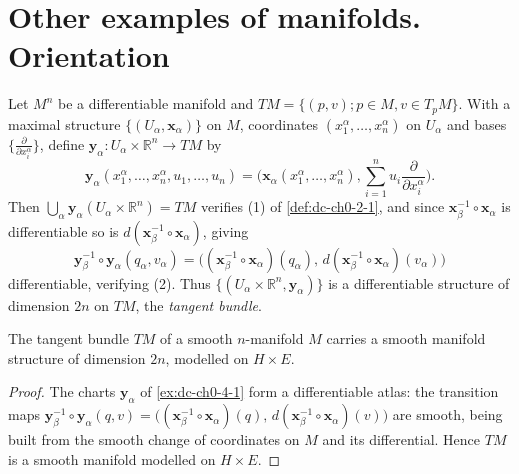 \section{Other examples of manifolds. Orientation}

\begin{example}
  \label{ex:dc-ch0-4-1}


  Let $M^n$ be a differentiable manifold and $TM=\{(p,v); p\in M, v\in T_pM\}$. With
  a maximal structure $\{(U_\alpha,\mathbf{x}_\alpha)\}$ on $M$, coordinates
  $(x_1^\alpha,\dots,x_n^\alpha)$ on $U_\alpha$ and bases
  $\{\frac{\partial}{\partial x_i^\alpha}\}$, define
  $\mathbf{y}_\alpha:U_\alpha\times\mathbb{R}^n\to TM$ by
  $$
  \mathbf{y}_\alpha(x_1^\alpha,\dots,x_n^\alpha,u_1,\dots,u_n)=\Big(\mathbf{x}_\alpha(x_1^\alpha,\dots,x_n^\alpha),\sum_{i=1}^n u_i\frac{\partial}{\partial x_i^\alpha}\Big).
  $$
  Then $\bigcup_\alpha\mathbf{y}_\alpha(U_\alpha\times\mathbb{R}^n)=TM$ verifies (1)
  of \cref{def:dc-ch0-2-1}, and since $\mathbf{x}_\beta^{-1}\circ\mathbf{x}_\alpha$ is
  differentiable so is $d(\mathbf{x}_\beta^{-1}\circ\mathbf{x}_\alpha)$, giving
  $$
  \mathbf{y}_\beta^{-1}\circ\mathbf{y}_\alpha(q_\alpha,v_\alpha)=\big((\mathbf{x}_\beta^{-1}\circ\mathbf{x}_\alpha)(q_\alpha),\,d(\mathbf{x}_\beta^{-1}\circ\mathbf{x}_\alpha)(v_\alpha)\big)
  $$
  differentiable, verifying (2). Thus $\{(U_\alpha\times\mathbb{R}^n,\mathbf{y}_\alpha)\}$
  is a differentiable structure of dimension $2n$ on $TM$, the \emph{tangent bundle}.
\end{example}

\begin{lemma}
  \label{lem:dc-ch0-4-1-manifold}


  The tangent bundle $TM$ of a smooth $n$-manifold $M$ carries a smooth manifold
  structure of dimension $2n$, modelled on $H\times E$.
\end{lemma}
\begin{proof}
  \sketch

  The charts $\mathbf{y}_\alpha$ of \cref{ex:dc-ch0-4-1} form a differentiable
  atlas: the transition maps
  $\mathbf{y}_\beta^{-1}\circ\mathbf{y}_\alpha(q,v)=\big((\mathbf{x}_\beta^{-1}\circ\mathbf{x}_\alpha)(q),\,d(\mathbf{x}_\beta^{-1}\circ\mathbf{x}_\alpha)(v)\big)$
  are smooth, being built from the smooth change of coordinates on $M$ and its
  differential. Hence $TM$ is a smooth manifold modelled on $H\times E$.
\end{proof}

